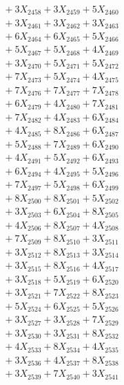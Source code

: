 \documentclass[a4paper,10pt]{article}
\begin{document}
{\begin{align}
&\;  + 3 X_{2458} + 3 X_{2459} + 5 X_{2460} \\[0.3ex]
&\;  + 3 X_{2461} + 3 X_{2462} + 3 X_{2463} \\[0.3ex]
&\;  + 6 X_{2464} + 6 X_{2465} + 5 X_{2466} \\[0.3ex]
&\;  + 5 X_{2467} + 5 X_{2468} + 4 X_{2469} \\[0.5ex]\allowbreak
&\;  + 3 X_{2470} + 5 X_{2471} + 5 X_{2472} \\[0.3ex]
&\;  + 7 X_{2473} + 5 X_{2474} + 4 X_{2475} \\[0.3ex]
&\;  + 7 X_{2476} + 7 X_{2477} + 7 X_{2478} \\[0.3ex]
&\;  + 6 X_{2479} + 4 X_{2480} + 7 X_{2481} \\[0.3ex]
&\;  + 7 X_{2482} + 4 X_{2483} + 6 X_{2484} \\[0.3ex]
&\;  + 4 X_{2485} + 8 X_{2486} + 6 X_{2487} \\[0.3ex]
&\;  + 5 X_{2488} + 7 X_{2489} + 6 X_{2490} \\[0.3ex]
&\;  + 4 X_{2491} + 5 X_{2492} + 6 X_{2493} \\[0.3ex]
&\;  + 6 X_{2494} + 4 X_{2495} + 5 X_{2496} \\[0.3ex]
&\;  + 7 X_{2497} + 5 X_{2498} + 6 X_{2499} \\[0.5ex]\allowbreak
&\;  + 8 X_{2500} + 8 X_{2501} + 5 X_{2502} \\[0.3ex]
&\;  + 3 X_{2503} + 6 X_{2504} + 8 X_{2505} \\[0.3ex]
&\;  + 4 X_{2506} + 8 X_{2507} + 4 X_{2508} \\[0.3ex]
&\;  + 7 X_{2509} + 8 X_{2510} + 3 X_{2511} \\[0.3ex]
&\;  + 3 X_{2512} + 8 X_{2513} + 3 X_{2514} \\[0.3ex]
&\;  + 3 X_{2515} + 8 X_{2516} + 4 X_{2517} \\[0.3ex]
&\;  + 3 X_{2518} + 5 X_{2519} + 6 X_{2520} \\[0.3ex]
&\;  + 3 X_{2521} + 7 X_{2522} + 8 X_{2523} \\[0.3ex]
&\;  + 5 X_{2524} + 6 X_{2525} + 5 X_{2526} \\[0.3ex]
&\;  + 3 X_{2527} + 3 X_{2528} + 7 X_{2529} \\[0.5ex]\allowbreak
&\;  + 3 X_{2530} + 3 X_{2531} + 8 X_{2532} \\[0.3ex]
&\;  + 4 X_{2533} + 8 X_{2534} + 4 X_{2535} \\[0.3ex]
&\;  + 3 X_{2536} + 4 X_{2537} + 8 X_{2538} \\[0.3ex]
&\;  + 3 X_{2539} + 7 X_{2540} + 3 X_{2541} \\[0.3ex]

\end{align}}
\end{document}
